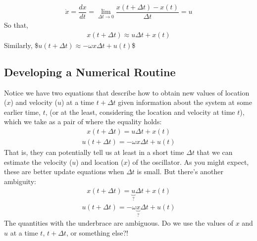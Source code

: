 \documentclass[letterpaper,10pt,english]{jupyterBook}
\begin{document}
\begin{equation*}
\begin{split}\dot{x} = \dfrac{dx}{dt} = \lim_{\Delta t \rightarrow 0} \dfrac{x(t+\Delta t) - x(t)}{\Delta t} = u\end{split}
\end{equation*}
\sphinxAtStartPar
So that,
\begin{equation*}
\begin{split}x(t+\Delta t) \approx u\Delta t + x(t)\end{split}
\end{equation*}
\sphinxAtStartPar
Similarly,
\$\(u(t+\Delta t) \approx -\omega x \Delta t + u(t)\)\$


\subsection{Developing a Numerical Routine}
\label{\detokenize{content/1_modeling/SHO-numerical:developing-a-numerical-routine}}
\sphinxAtStartPar
Notice we have two equations that describe how to obtain new values of location (\(x\)) and velocity (\(u\)) at a time \(t+\Delta t\) given information about the system at some earlier time, \(t\), (or at the least, considering the location and velocity at time \(t\)), which we take as a pair of  where the equality holds:
\begin{equation*}
\begin{split}x(t+\Delta t) = u\Delta t + x(t)\end{split}
\end{equation*}\begin{equation*}
\begin{split}u(t+\Delta t) = -\omega x \Delta t + u(t)\end{split}
\end{equation*}
\sphinxAtStartPar
That is, they can potentially tell us at least in a short time \(\Delta t\) that we can estimate the velocity (\(u\)) and location (\(x\)) of the oscillator.  As you might expect, these are better update equations when \(\Delta t\) is small. But there’s another ambiguity:
\begin{equation*}
\begin{split}x(t+\Delta t) = \underbrace{u}_{\mathtt{?}}\Delta t + x(t)\end{split}
\end{equation*}\begin{equation*}
\begin{split}u(t+\Delta t) = -\omega \underbrace{x}_{\mathtt{?}} \Delta t + u(t)\end{split}
\end{equation*}
\sphinxAtStartPar
The quantities with the underbrace are ambiguous. Do we use the values of \(x\) and \(u\) at a time \(t\), \(t+\Delta t\), or something else?!
\end{document}
